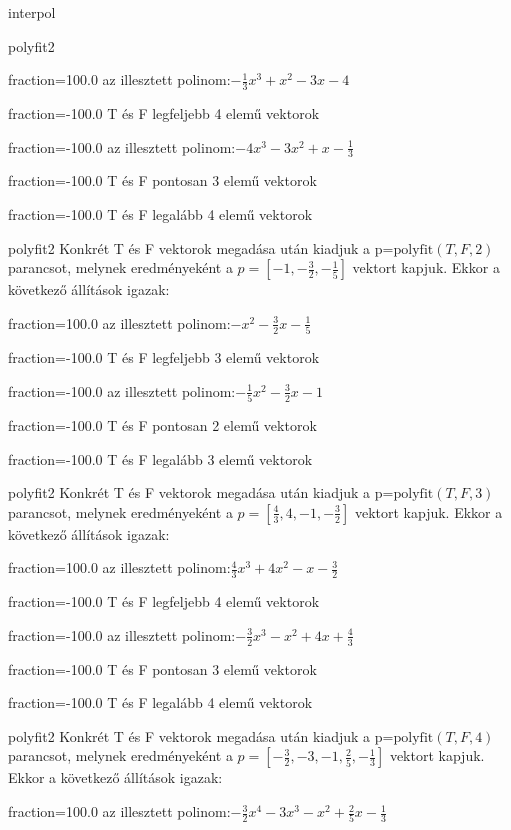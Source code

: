 \documentclass[12pt]{article}
\begin{document}
\begin{quiz}{interpol}
\begin{multi}[multiple]{polyfit2}
\item[fraction=100.0] az illesztett polinom:$-\frac{1}{3}x^3+x^2-3x-4$
\item[fraction=-100.0]  T és F legfeljebb 4 elemű vektorok
\item[fraction=-100.0]  az illesztett polinom:$-4x^3-3x^2+x-\frac{1}{3}$
\item[fraction=-100.0]  T és F pontosan 3 elemű vektorok
\item[fraction=-100.0] T és F legalább 4 elemű vektorok
\end{multi}
\begin{multi}[multiple]{polyfit2}
Konkrét T és F vektorok megadása után kiadjuk a p=$\mathrm{polyfit}(T,F,2)$
parancsot, melynek eredményeként a $p=\left[-1,-\frac{3}{2},-\frac{1}{5}\right]$ vektort kapjuk.
Ekkor a következő állítások igazak:
\item[fraction=100.0] az illesztett polinom:$-x^2-\frac{3}{2}x-\frac{1}{5}$
\item[fraction=-100.0]  T és F legfeljebb 3 elemű vektorok
\item[fraction=-100.0]  az illesztett polinom:$-\frac{1}{5}x^2-\frac{3}{2}x-1$
\item[fraction=-100.0]  T és F pontosan 2 elemű vektorok
\item[fraction=-100.0] T és F legalább 3 elemű vektorok
\end{multi}
\begin{multi}[multiple]{polyfit2}
Konkrét T és F vektorok megadása után kiadjuk a p=$\mathrm{polyfit}(T,F,3)$
parancsot, melynek eredményeként a $p=\left[\frac{4}{3},4,-1,-\frac{3}{2}\right]$ vektort kapjuk.
Ekkor a következő állítások igazak:
\item[fraction=100.0] az illesztett polinom:$\frac{4}{3}x^3+4x^2-x-\frac{3}{2}$
\item[fraction=-100.0]  T és F legfeljebb 4 elemű vektorok
\item[fraction=-100.0]  az illesztett polinom:$-\frac{3}{2}x^3-x^2+4x+\frac{4}{3}$
\item[fraction=-100.0]  T és F pontosan 3 elemű vektorok
\item[fraction=-100.0] T és F legalább 4 elemű vektorok
\end{multi}
\begin{multi}[multiple]{polyfit2}
Konkrét T és F vektorok megadása után kiadjuk a p=$\mathrm{polyfit}(T,F,4)$
parancsot, melynek eredményeként a $p=\left[-\frac{3}{2},-3,-1,\frac{2}{5},-\frac{1}{3}\right]$ vektort kapjuk.
Ekkor a következő állítások igazak:
\item[fraction=100.0] az illesztett polinom:$-\frac{3}{2}x^4-3x^3-x^2+\frac{2}{5}x-\frac{1}{3}$

\end{multi}
\end{quiz}
\end{document}
